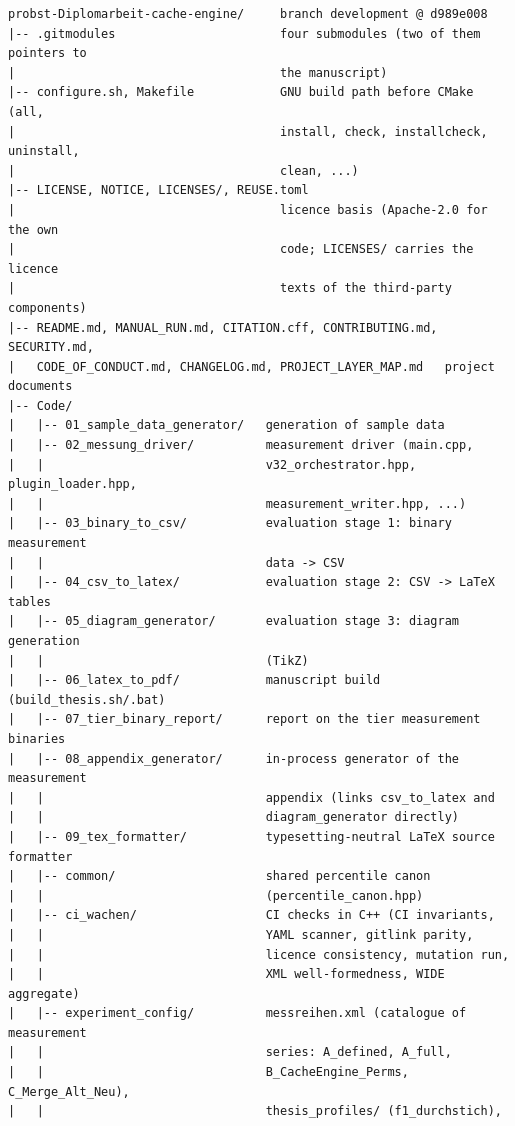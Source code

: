 {\footnotesize
\begin{verbatim}
probst-Diplomarbeit-cache-engine/     branch development @ d989e008
|-- .gitmodules                       four submodules (two of them pointers to
|                                     the manuscript)
|-- configure.sh, Makefile            GNU build path before CMake (all,
|                                     install, check, installcheck, uninstall,
|                                     clean, ...)
|-- LICENSE, NOTICE, LICENSES/, REUSE.toml
|                                     licence basis (Apache-2.0 for the own
|                                     code; LICENSES/ carries the licence
|                                     texts of the third-party components)
|-- README.md, MANUAL_RUN.md, CITATION.cff, CONTRIBUTING.md, SECURITY.md,
|   CODE_OF_CONDUCT.md, CHANGELOG.md, PROJECT_LAYER_MAP.md   project documents
|-- Code/
|   |-- 01_sample_data_generator/   generation of sample data
|   |-- 02_messung_driver/          measurement driver (main.cpp,
|   |                               v32_orchestrator.hpp, plugin_loader.hpp,
|   |                               measurement_writer.hpp, ...)
|   |-- 03_binary_to_csv/           evaluation stage 1: binary measurement
|   |                               data -> CSV
|   |-- 04_csv_to_latex/            evaluation stage 2: CSV -> LaTeX tables
|   |-- 05_diagram_generator/       evaluation stage 3: diagram generation
|   |                               (TikZ)
|   |-- 06_latex_to_pdf/            manuscript build (build_thesis.sh/.bat)
|   |-- 07_tier_binary_report/      report on the tier measurement binaries
|   |-- 08_appendix_generator/      in-process generator of the measurement
|   |                               appendix (links csv_to_latex and
|   |                               diagram_generator directly)
|   |-- 09_tex_formatter/           typesetting-neutral LaTeX source formatter
|   |-- common/                     shared percentile canon
|   |                               (percentile_canon.hpp)
|   |-- ci_wachen/                  CI checks in C++ (CI invariants,
|   |                               YAML scanner, gitlink parity,
|   |                               licence consistency, mutation run,
|   |                               XML well-formedness, WIDE aggregate)
|   |-- experiment_config/          messreihen.xml (catalogue of measurement
|   |                               series: A_defined, A_full,
|   |                               B_CacheEngine_Perms, C_Merge_Alt_Neu),
|   |                               thesis_profiles/ (f1_durchstich),

\end{verbatim}}
